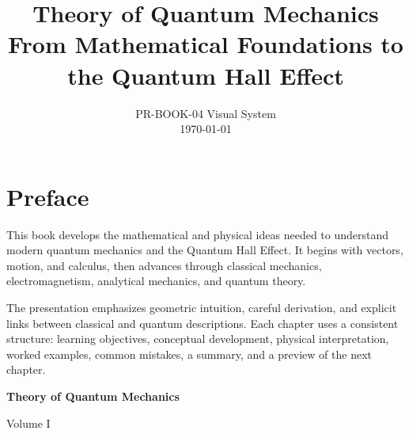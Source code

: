 \documentclass[11pt,a4paper,openany]{book}
\title{\Huge\bfseries Theory of Quantum Mechanics\\[0.55em]
\Large From Mathematical Foundations to the Quantum Hall Effect}
\author{}
\date{PR-BOOK-04 Visual System\\\today}
\newcounter{example}[chapter]
\begin{document}
	
	

\frontmatter

\maketitle

\clearpage

\tableofcontents

\clearpage

\chapter*{Preface}

This book develops the mathematical and physical ideas needed to understand
modern quantum mechanics and the Quantum Hall Effect. It begins with vectors,
motion, and calculus, then advances through classical mechanics,
electromagnetism, analytical mechanics, and quantum theory.

The presentation emphasizes geometric intuition, careful derivation, and
explicit links between classical and quantum descriptions. Each chapter uses a
consistent structure: learning objectives, conceptual development, physical
interpretation, worked examples, common mistakes, a summary, and a preview of
the next chapter.

\clearpage

	

\frontmatter


\begin{titlepage}
	\centering
	\vspace*{\fill}
	
	{\Huge\bfseries Theory of Quantum Mechanics\par}
	
	\vspace{1cm}
	
	{\Large Volume I}
	
	\vspace*{\fill}
\end{titlepage}
\end{document}
